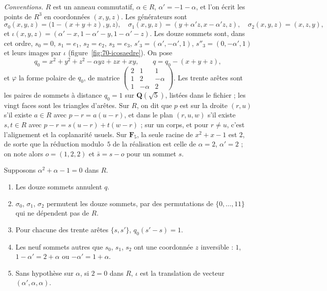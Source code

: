 \noindent\emph{Conventions.} $R$ est un anneau commutatif, $\alpha \in R$, $\alpha' = -1 - \alpha$, et l'on écrit les points de $R^3$ en coordonnées $(x, y, z)$. Les générateurs sont
\[
\sigma_0(x, y, z) = \bigl(1 - (x + y + z), y, z\bigr), \quad \sigma_1(x, y, z) = (y + \alpha' z, x - \alpha' z, z), \quad \sigma_2(x, y, z) = (x, z, y),
\]
et $\iota(x, y, z) = (\alpha' - x, 1 - \alpha' - y, 1 - \alpha' - z)$. Les douze sommets sont, dans cet ordre, $s_0 = 0$, $s_1 = e_1$, $s_2 = e_2$, $s_3 = e_3$, $s'_3 = (\alpha', -\alpha', 1)$, $s''_3 = (0, -\alpha', 1)$ et leurs images par $\iota$ (figure~\ref{fig:70-icosaedre}). On pose
\[
q_0 = x^2 + y^2 + z^2 - \alpha yz + zx + xy, \qquad q = q_0 - (x + y + z),
\]
et $\varphi$ la forme polaire de $q_0$, de matrice $\begin{pmatrix} 2 & 1 & 1 \\ 1 & 2 & -\alpha \\ 1 & -\alpha & 2 \end{pmatrix}$. Les trente arêtes sont les paires de sommets à distance $q_0 = 1$ sur $\mathbf Q(\sqrt 5)$, listées dans le fichier ; les vingt faces sont les triangles d'arêtes. Sur $R$, on dit que $p$ est sur la droite $(r, u)$ s'il existe $a \in R$ avec $p - r = a(u - r)$, et dans le plan $(r, u, w)$ s'il existe $s, t \in R$ avec $p - r = s(u - r) + t(w - r)$ ; sur un corps, et pour $r \neq u$, c'est l'alignement et la coplanarité usuels. Sur $\mathbf F_5$, la seule racine de $x^2 + x - 1$ est $2$, de sorte que la réduction modulo~$5$ de la réalisation est celle de $\alpha = 2$, $\alpha' = 2$ ; on note alors $o = (1, 2, 2)$ et $\bar s = s - o$ pour un sommet $s$.

\begin{enonce}
Supposons $\alpha^2 + \alpha - 1 = 0$ dans $R$.
\begin{enumerate}
\item Les douze sommets annulent $q$.
\item $\sigma_0$, $\sigma_1$, $\sigma_2$ permutent les douze sommets, par des permutations de $\{0, \dots, 11\}$ qui ne dépendent pas de $R$.
\item Pour chacune des trente arêtes $\{s, s'\}$, $q_0(s' - s) = 1$.
\item Les neuf sommets autres que $s_0$, $s_1$, $s_2$ ont une coordonnée $z$ inversible : $1$, $1 - \alpha' = 2 + \alpha$ ou $-\alpha' = 1 + \alpha$.
\item Sans hypothèse sur $\alpha$, si $2 = 0$ dans $R$, $\iota$ est la translation de vecteur $(\alpha', \alpha, \alpha)$.
\end{enumerate}
\end{enonce}

